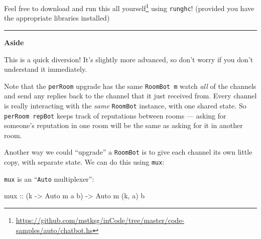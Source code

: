 \documentclass[]{article}
\newenvironment{Shaded}{\begin{snugshade}}{\end{snugshade}}
\newcommand{\CommentTok}[1]{\textcolor[rgb]{0.56,0.35,0.01}{\textit{#1}}}
\newcommand{\DataTypeTok}[1]{\textcolor[rgb]{0.13,0.29,0.53}{#1}}
\newcommand{\FunctionTok}[1]{\textcolor[rgb]{0.00,0.00,0.00}{#1}}
\newcommand{\KeywordTok}[1]{\textcolor[rgb]{0.13,0.29,0.53}{\textbf{#1}}}
\newcommand{\NormalTok}[1]{#1}
\newcommand{\OtherTok}[1]{\textcolor[rgb]{0.56,0.35,0.01}{#1}}
\renewcommand{\href}[2]{#2\footnote{\url{#1}}}
\begin{document}
Feel free to
\href{https://github.com/mstksg/inCode/tree/master/code-samples/auto/chatbot.hs}{download
and run this all yourself} using \texttt{runghc}! (provided you have the
appropriate libraries installed)

\begin{center}\rule{0.5\linewidth}{\linethickness}\end{center}

\textbf{Aside}

This is a quick diversion! It's slightly more advanced, so don't worry if you
don't understand it immediately.

Note that the \texttt{perRoom} upgrade has the same \texttt{RoomBot\ m} watch
\emph{all} of the channels and send any replies back to the channel that it just
received from. Every channel is really interacting with the \emph{same}
\texttt{RoomBot} instance, with one shared state. So \texttt{perRoom\ repBot}
keeps track of reputations between rooms --- asking for someone's reputation in
one room will be the same as asking for it in another room.

Another way we could ``upgrade'' a \texttt{RoomBot} is to give each channel its
own little copy, with separate state. We can do this using \texttt{mux}:

\begin{Shaded}
\end{Shaded}

\texttt{mux} is an ``\texttt{Auto} multiplexer'':

\begin{Shaded}
\begin{Highlighting}[]
\OtherTok{mux ::}\NormalTok{ (k }\OtherTok{->} \DataTypeTok{Auto}\NormalTok{ m a b) }\OtherTok{->} \DataTypeTok{Auto}\NormalTok{ m (k, a) b}
\end{Highlighting}
\end{Shaded}
\end{document}
